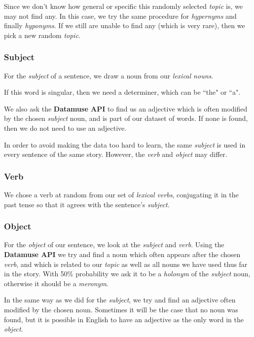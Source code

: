 Since we don't know how general or specific this randomly selected \textit{topic} is, we may not find any. In this case, we try the same procedure for \textit{hypernyms} and finally \textit{hyponyms}. If we still are unable to find any (which is very rare), then we pick a new random \textit{topic}.

\subsubsection{Subject}

For the \textit{subject} of a sentence, we draw a noun from our \textit{lexical nouns}.

If this word is singular, then we need a determiner, which can be ``the" or ``a".

We also ask the \textbf{Datamuse API} to find us an adjective which is often modified by the chosen \textit{subject} noun, and is part of our dataset of words. If none is found, then we do not need to use an adjective.

In order to avoid making the data too hard to learn, the same \textit{subject} is used in every sentence of the same story. However, the \textit{verb} and \textit{object} may differ.

\subsubsection{Verb}

We chose a verb at random from our set of \textit{lexical verbs}, conjugating it in the past tense so that it agrees with the sentence's \textit{subject}.

\subsubsection{Object}

For the \textit{object} of our sentence, we look at the \textit{subject} and \textit{verb}. Using the \textbf{Datamuse API} we try and find a noun which often appears after the chosen \textit{verb}, and which is related to our \textit{topic} as well as all nouns we have used thus far in the story. With 50\% probability we ask it to be a \textit{holonym} of the \textit{subject} noun, otherwise it should be a \textit{meronym}.

In the same way as we did for the \textit{subject}, we try and find an adjective often modified by the chosen noun. Sometimes it will be the case that no noun was found, but it is possible in English to have an adjective as the only word in the \textit{object}.

